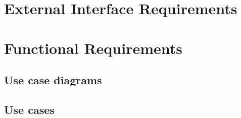 \section{External Interface Requirements}
\section{Functional Requirements}
\subsection{Use case diagrams}
\subsection{Use cases}
